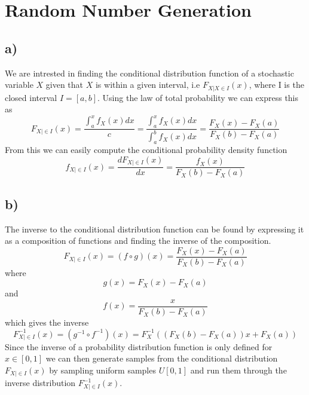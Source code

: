 \documentclass[a4paper]{article}
\begin{document}
 
\section*{Random Number Generation}

\subsection*{a)}
We are intrested in finding the conditional distribution function of a stochastic variable $X$ given that $X$ is within a given interval, i.e $F_{X|X\in I}(x)$, where I is the closed interval $I = [a,b]$. Using the law of total probability we can express this as
\begin{equation}
    F_{X|\in{I}}(x) = \frac{\int_a^xf_X(x)dx}{c} = \frac{\int_a^xf_X(x)dx}{\int_a^bf_X(x)dx} = \frac{F_X(x)-F_X(a)}{F_X(b)-F_X(a)}
\end{equation}
From this we can easily compute the conditional probability density function
\begin{equation}
    f_{X|\in{I}}(x) = \frac{dF_{X|\in{I}}(x)}{dx} = \frac{f_X(x)}{F_X(b)-F_X(a)}
\end{equation}

\subsection*{b)}
The inverse to the conditional distribution function can be found by expressing it as a composition of functions and finding the inverse of the composition.
\begin{equation}
    F_{X|\in{I}}(x) = (f \circ g)(x) = \frac{F_X(x)-F_X(a)}{F_X(b)-F_X(a)}
\end{equation}
where
\begin{equation}
    g(x) = F_X(x) - F_X(a)
\end{equation}
and
\begin{equation}
    f(x) = \frac{x}{F_X(b) - F_X(a)}
\end{equation}
which gives the inverse
\begin{equation}
    F_{X|\in{I}}^{-1}(x) = (g^{-1} \circ f^{-1})(x) = F_X^{-1}((F_X(b)- F_X(a))x + F_X(a))
\end{equation}
Since the inverse of a probability distribution function is only defined for $x \in [0,1]$ we can then generate samples from the conditional distribution $ F_{X|\in{I}}(x)$ by sampling uniform samples $U[0,1]$ and run them through the inverse distribution $F_{X|\in{I}}^{-1}(x)$.
\end{document}
